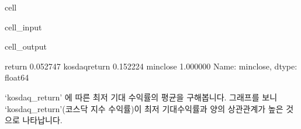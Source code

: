 \documentclass[letterpaper,10pt,english]{jupyterBook}
\begin{document}
\begin{sphinxuseclass}{cell}\begin{sphinxVerbatimInput}

\begin{sphinxuseclass}{cell_input}
\begin{sphinxVerbatim}[commandchars=\\\{\}]
\PYG{p}{[}\PYG{p}{[}\PYG{p}{]}\PYG{p}{]}\PYG{p}{[}\PYG{p}{]}
\end{sphinxVerbatim}

\end{sphinxuseclass}\end{sphinxVerbatimInput}
\begin{sphinxVerbatimOutput}

\begin{sphinxuseclass}{cell_output}
\begin{sphinxVerbatim}[commandchars=\\\{\}]
return          \PYGZhy{}0.052747
kosdaq\PYGZus{}return    0.152224
min\PYGZus{}close        1.000000
Name: min\PYGZus{}close, dtype: float64
\end{sphinxVerbatim}

\end{sphinxuseclass}\end{sphinxVerbatimOutput}

\end{sphinxuseclass}
\sphinxAtStartPar
 ‘kosdaq\_return’ 에 따른 최저 기대 수익률의 평균을 구해봅니다. 그래프를 보니 ‘kosdaq\_return’(코스닥 지수 수익률)이 최저 기대수익률과 양의 상관관계가 높은 것으로 나타납니다.
\end{document}
